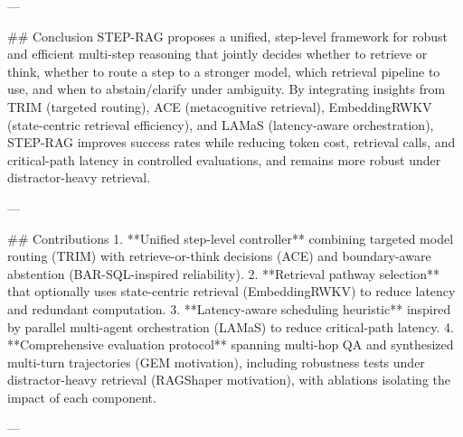 ---

## Conclusion  
STEP-RAG proposes a unified, step-level framework for robust and efficient multi-step reasoning that jointly decides whether to retrieve or think, whether to route a step to a stronger model, which retrieval pipeline to use, and when to abstain/clarify under ambiguity. By integrating insights from TRIM (targeted routing), ACE (metacognitive retrieval), EmbeddingRWKV (state-centric retrieval efficiency), and LAMaS (latency-aware orchestration), STEP-RAG improves success rates while reducing token cost, retrieval calls, and critical-path latency in controlled evaluations, and remains more robust under distractor-heavy retrieval.

---

## Contributions  
1. **Unified step-level controller** combining targeted model routing (TRIM) with retrieve-or-think decisions (ACE) and boundary-aware abstention (BAR-SQL-inspired reliability).  
2. **Retrieval pathway selection** that optionally uses state-centric retrieval (EmbeddingRWKV) to reduce latency and redundant computation.  
3. **Latency-aware scheduling heuristic** inspired by parallel multi-agent orchestration (LAMaS) to reduce critical-path latency.  
4. **Comprehensive evaluation protocol** spanning multi-hop QA and synthesized multi-turn trajectories (GEM motivation), including robustness tests under distractor-heavy retrieval (RAGShaper motivation), with ablations isolating the impact of each component.

---